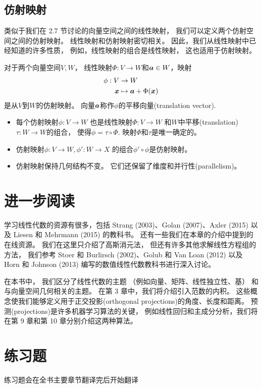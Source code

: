 \subsection{仿射映射}

类似于我们在 2.7 节讨论的向量空间之间的线性映射，
我们可以定义两个仿射空间之间的仿射映射。
线性映射和仿射映射密切相关。
因此，我们从线性映射中已经知道的许多性质，
例如，线性映射的组合是线性映射，
这也适用于仿射映射。

\begin{definition}[仿射映射]
    对于两个向量空间$V, W$，
    线性映射$\Phi : V \rightarrow W$和$\boldsymbol{a} \in W$，映射
    \begin{align}
        \phi : V &\rightarrow W \\
              \boldsymbol{x} &\mapsto \boldsymbol{a} + \Phi(\boldsymbol{x})
    \end{align}
    是从$V$到$W$的仿射映射。
    向量$\boldsymbol{a}$称作$\phi$的平移向量(translation vector).
\end{definition}

\begin{itemize}
    \item 每个仿射映射$\phi : V \rightarrow W$
          也是线性映射$\Phi : V \rightarrow W$
          和$W$中平移(translation)$\tau : W \rightarrow W$的组合，
          使得$\phi = \tau \circ \Phi$.
          映射$\Phi$和$\tau$是唯一确定的。
    \item 仿射映射$\phi: V \rightarrow W, \phi':W \rightarrow X$
          的组合$\phi' \circ \phi$是仿射映射。
    \item 仿射映射保持几何结构不变。 它们还保留了维度和并行性(parallelism)。
\end{itemize}

\section{进一步阅读}

学习线性代数的资源有很多，包括 Strang (2003)、Golan (2007)、Axler (2015) 以及 Liesen 和 Mehrmann (2015) 的教科书。
还有一些我们在本章的介绍中提到的在线资源。
我们在这里只介绍了高斯消元法，
但还有许多其他求解线性方程组的方法，
我们参考 Stoer 和 Burlirsch (2002)、Golub 和 Van Loan (2012) 以及 Horn 和 Johnson (2013) 编写的数值线性代数教科书进行深入讨论。

在本书中，
我们区分了线性代数的主题
（例如向量、矩阵、线性独立性、基）
和与向量空间几何相关的主题。
在第 3 章中，我们将介绍引入范数的内积。
这些概念使我们能够定义用于正交投影(orthogonal projections)的角度、长度和距离。
预测(projections)是许多机器学习算法的关键，
例如线性回归和主成分分析，我们将在第 9 章和第 10 章分别介绍这两种算法。

\section*{练习题}

练习题会在全书主要章节翻译完后开始翻译
